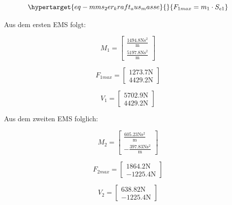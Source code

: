 \documentclass[
  letterpaper,
  DIV=11]{scrreprt}
\begin{document}
\begin{equation}\protect\hypertarget{eq-mms_2er_kraft_aus_masse}{}{
F_{1max} = m_1 \cdot S_{e1}
}\label{eq-mms_2er_kraft_aus_masse}\end{equation}

Aus dem ersten EMS folgt:

\begin{equation}M_{1} = \left[\begin{matrix}\frac{1494.8 \text{N} \text{s}^{2}}{\text{m}}\\\frac{5197.8 \text{N} \text{s}^{2}}{\text{m}}\end{matrix}\right]\end{equation}

\begin{equation}F_{1 max} = \left[\begin{matrix}1273.7 \text{N}\\4429.2 \text{N}\end{matrix}\right]\end{equation}

\begin{equation}V_{1} = \left[\begin{matrix}5702.9 \text{N}\\4429.2 \text{N}\end{matrix}\right]\end{equation}

Aus dem zweiten EMS folglich:

\begin{equation}M_{2} = \left[\begin{matrix}\frac{605.23 \text{N} \text{s}^{2}}{\text{m}}\\- \frac{397.83 \text{N} \text{s}^{2}}{\text{m}}\end{matrix}\right]\end{equation}

\begin{equation}F_{2 max} = \left[\begin{matrix}1864.2 \text{N}\\- 1225.4 \text{N}\end{matrix}\right]\end{equation}

\begin{equation}V_{2} = \left[\begin{matrix}638.82 \text{N}\\- 1225.4 \text{N}\end{matrix}\right]\end{equation}
\end{document}
